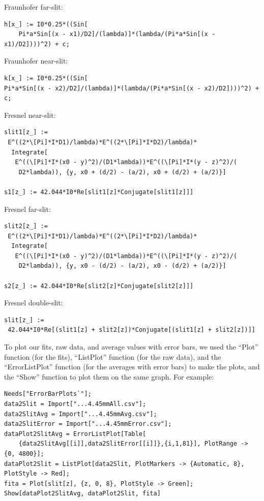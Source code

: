 \documentclass[prb,preprint]{revtex4-1}
\begin{document}
Fraunhofer far-slit:
\begin{verbatim}
h[x_] := I0*0.25*((Sin[
	Pi*a*Sin[(x - x1)/D2]/(lambda)]*(lambda/(Pi*a*Sin[(x - x1)/D2])))^2) + c;
\end{verbatim}

Fraunhofer near-slit:
\begin{verbatim}
k[x_] := I0*0.25*((Sin[
Pi*a*Sin[(x - x2)/D2]/(lambda)]*(lambda/(Pi*a*Sin[(x - x2)/D2])))^2) + c;
\end{verbatim}

Fresnel near-slit:
\begin{verbatim}
slit1[z_] := 
 E^((2*\[Pi]*I*D1)/lambda)*E^((2*\[Pi]*I*D2)/lambda)*
  Integrate[
   E^((\[Pi]*I*(x0 - y)^2)/(D1*lambda))*E^((\[Pi]*I*(y - z)^2)/(
    D2*lambda)), {y, x0 + (d/2) - (a/2), x0 + (d/2) + (a/2)}]

s1[z_] := 42.044*I0*Re[slit1[z]*Conjugate[slit1[z]]]
\end{verbatim}

Fresnel far-slit:
\begin{verbatim}
slit2[z_] := 
 E^((2*\[Pi]*I*D1)/lambda)*E^((2*\[Pi]*I*D2)/lambda)*
  Integrate[
   E^((\[Pi]*I*(x0 - y)^2)/(D1*lambda))*E^((\[Pi]*I*(y - z)^2)/(
    D2*lambda)), {y, x0 - (d/2) - (a/2), x0 - (d/2) + (a/2)}]

s2[z_] := 42.044*I0*Re[slit2[z]*Conjugate[slit2[z]]]
\end{verbatim}

Fresnel double-slit:
\begin{verbatim}
slit[z_] := 
 42.044*I0*Re[(slit1[z] + slit2[z])*Conjugate[(slit1[z] + slit2[z])]]
\end{verbatim}

To plot our fits, raw data, and average values with error bars, we used the ``Plot'' function (for the fits), ``ListPlot'' function (for the raw data), and the ``ErrorListPlot'' function (for the averages with error bars) to make the plots, and the ``Show'' function to plot them on the same graph. For example:
\begin{verbatim}
Needs["ErrorBarPlots`"];
data2Slit = Import["...4.45mmAll.csv"];
data2SlitAvg = Import["...4.45mmAvg.csv"];
data2SlitError = Import["...4.45mmError.csv"];
dataPlot2SlitAvg = ErrorListPlot[Table[
	{data2SlitAvg[[i]],data2SlitError[[i]]},{i,1,81}], PlotRange -> {0, 4800}];
dataPlot2Slit = ListPlot[data2Slit, PlotMarkers -> {Automatic, 8}, PlotStyle -> Red];
fita = Plot[slit[z], {z, 0, 8}, PlotStyle -> Green];
Show[dataPlot2SlitAvg, dataPlot2Slit, fita]
\end{verbatim}
\end{document}
